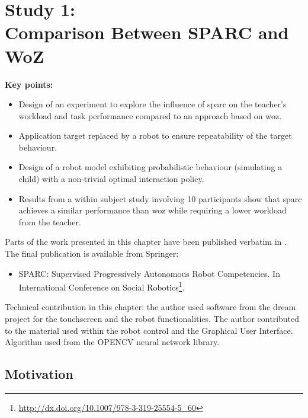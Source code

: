 \chapter[Study 1: Comparison Between SPARC and WoZ]{Study 1: \\ Comparison Between SPARC and WoZ}\label{chap:woz}
\glsresetall
\graphicspath{{images/woz/}}

\begin{framed}
	\textbf{Key points:}
	
	\begin{itemize}
		\item Design of an experiment to explore the influence of \acrshort{sparc} on the teacher's workload and task performance compared to an approach based on \acrshort{woz}.
		\item Application target replaced by a robot to ensure repeatability of the target behaviour.
		\item Design of a robot model exhibiting probabilistic behaviour (simulating a child) with a non-trivial optimal interaction policy.
		\item Results from a within subject study involving 10 participants show that \acrshort{sparc} achieves a similar performance than \acrshort{woz} while requiring a lower workload from the teacher.
	\end{itemize}
\end{framed}

Parts of the work presented in this chapter have been published verbatim in \cite{senft2015sparc}. The final publication is available from Springer:
\begin{itemize}
	\item SPARC: Supervised	Progressively Autonomous Robot Competencies. In International Conference on	Social Robotics\footnote{\url{http://dx.doi.org/10.1007/978-3-319-25554-5_60}}.
\end{itemize} 

Technical contribution in this chapter: the author used software from the \acrshort{dream} project for the touchscreen and the robot functionalities. The author contributed to the material used within the robot control and the Graphical User Interface. Algorithm used from the OPENCV neural network library.

\newpage

\section{Motivation}

